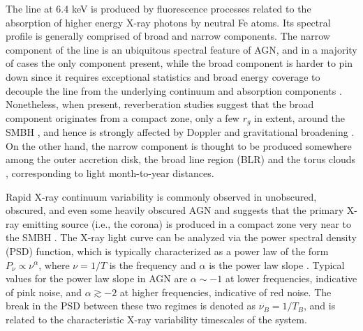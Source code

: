 The \kalfa{} line at 6.4 keV is produced by fluorescence processes related to the absorption of higher energy X-ray photons by neutral Fe atoms. Its spectral profile is generally comprised of broad and narrow components. The narrow component of the \kalfa{} line \citep[
$\rm FWHM {\lesssim} 10,000\:km\:s^{-1}$; e.g.,][]{2001MNRAS.323L..37L,2004ApJ...604...63Y,2010ApJS..187..581S} is an ubiquitous spectral feature of AGN, and in a majority of cases the only component present, while the broad component is harder to pin down since it requires exceptional statistics and broad energy coverage to decouple the line from the underlying continuum and absorption components \citep[e.g.,][]{2006AN....327.1032G, 2014ApJ...787...83M}.
Nonetheless, when present, reverberation studies suggest that the broad component originates from a compact zone, only a few $r_g$ in extent, around the SMBH \citep[e.g.,][]{2014MNRAS.438.2980C}, and hence is strongly affected by Doppler and gravitational broadening \citep[e.g.,][]{1995MNRAS.272L...9M,1995Natur.375..659T,1995ApJ...453L..81Y}. On the other hand, the narrow component is thought to be produced somewhere among the outer accretion disk, the broad line region (BLR) and the torus clouds \citep[e.g.,][]{1994MNRAS.267..743G,1994ApJ...420L..57K,1995ApJ...453L..81Y}, corresponding to light month-to-year distances. 

Rapid X-ray continuum variability is commonly observed in unobscured, obscured, and even some heavily obscured AGN and suggests that the primary X-ray emitting source (i.e., the corona) is produced in a compact zone very near to the SMBH \citep[e.g.,][]{1993ARA&A..31..717M, 2013MNRAS.431.2441D}. The X-ray light curve can be analyzed via the power spectral density (PSD) function, which is typically characterized as a power law of the form $P_{\nu} \propto \nu ^{\alpha}$, where $\nu = 1/T$ is the frequency and $\alpha$ is the power law slope \citep[e.g.,][]{1993MNRAS.265..664G, 1999ApJ...514..682E, 2003MNRAS.339.1237V}. Typical values for the power law slope in AGN are $\alpha{\sim}{-}1$ at lower frequencies, indicative of pink noise, and $\alpha\gtrsim-2$ at higher frequencies, indicative of red noise. The break in the PSD between these two regimes is denoted as $\nu_B = 1/T_B$, and is related to the characteristic X-ray variability timescales of the system. 

